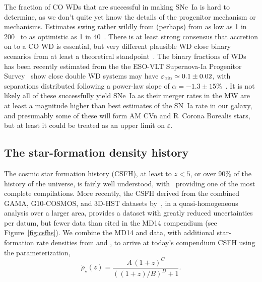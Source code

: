 \documentclass[apj]{aastex62}
\begin{document}
The fraction of CO WDs that are successful in making SNe~Ia is hard to determine, as we don't quite yet know the details of the progenitor mechanism or mechanisms. Estimates swing rather wildly from (perhaps) from as low as 1 in 200~\citep{Breedt:2017rp} to as optimistic as 1 in 40~\citep{Maoz:2012}. There is at least strong consensus that accretion on to a CO WD is essential, but very different plausible WD close binary scenarios from at least a theoretical standpoint~\citep{Nelemans:2001hb,Nelemans:2001cs}. The binary fractions of WDs has been recently estimated from the  the ESO-VLT Supernova-Ia Progenitor Survey~\citep[ SPY]{Napiwotzki:2007} show close double WD systems may have $\varepsilon_{\rm bin}\simeq0.1\pm0.02$, with separations distributed following a power-law slope of $\alpha=-1.3\pm15\%$~\citep{Maoz:2017zl}. It is not likely all of these successfully yield SNe~Ia as their merger rates in the MW are at least a magnitude higher than best estimates of the SN~Ia rate in our galaxy, and presumably some of these will form AM CVn and R~Corona Borealis stars, but at least it could be treated as an upper limit on $\varepsilon$.

\subsection{The star-formation density history}
The cosmic star formation history (CSFH), at least to $z < 5$, or over 90\% of the history of the universe, is fairly well understood, with~\cite[][ MD14 hereafter]{Madau:2014fk} providing one of the most complete compilations. More recently, the CSFH derived from the combined GAMA, G10-COSMOS, and 3D-HST datasets by~\cite{Driver:2018nr}, in a quasi-homogeneous analysis over a larger area, provides a dataset with greatly reduced uncertainties per datum, but fewer data than cited in the MD14 compendium (see Figure~\ref{fig:csfhs}).  We combine the MD14 and \cite{Driver:2018nr} data, with additional star-formation rate densities from \cite{Bouwens:2015qy} and \cite{Khusanova:2019kx}, to arrive at today's compendium CSFH using the parameterization,
\begin{equation}
\dot{\rho}_{\star}(z) = \frac{A\,(1+z)^C}{((1+z)/B)^D+1}.\label{eqn:mdp}
\end{equation}
\end{document}
